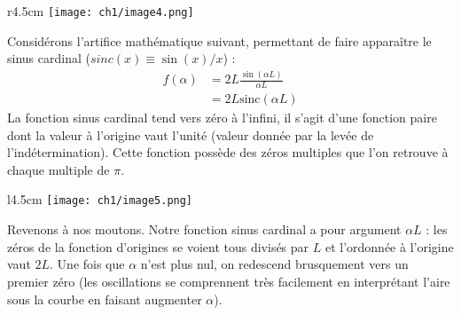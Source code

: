 \begin{wrapfigure}[8]{r}{4.5cm}
\vspace{-5mm}
\texttt{[image: ch1/image4.png]}
\end{wrapfigure}
Considérons l'artifice mathématique suivant, permettant de faire apparaître le 
sinus cardinal ($sinc(x) \equiv \sin (x)/x$) :
\begin{equation}
\begin{array}{ll}
f(\alpha) &= 2L \frac{\sin(\alpha L)}{\alpha L}\\
&= 2L\text{sinc}(\alpha L)
\end{array}
\end{equation}
La fonction sinus cardinal tend vers zéro à l'infini, il s'agit d'une fonction paire dont 
la valeur à l'origine vaut l'unité (valeur donnée par la levée de l'indétermination). Cette 
fonction possède des zéros multiples que l'on retrouve à chaque multiple de $\pi$.\newpage

\begin{wrapfigure}[8]{l}{4.5cm}
\texttt{[image: ch1/image5.png]}
\end{wrapfigure}
Revenons à nos moutons. Notre fonction sinus cardinal a pour argument $\alpha L$ : les zéros 
de la fonction d'origines se voient tous divisés par $L$ et l'ordonnée à l'origine vaut $2L$. 
Une fois que $\alpha$ n'est plus nul, on redescend brusquement vers un premier zéro (les 
oscillations se comprennent très facilement en interprétant l'aire sous la courbe en faisant 
augmenter $\alpha$).\\
\ \\

